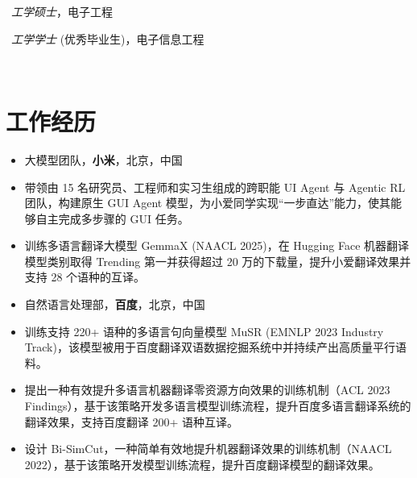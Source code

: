 \documentclass{resume}
\begin{document}
\ \textit{工学硕士}，电子工程

\ \textit{工学学士} (优秀毕业生)，电子信息工程

\



\section{工作经历}

\begin{itemize}
\item[] 大模型团队，\textbf{小米}，北京，中国
\item 带领由 15 名研究员、工程师和实习生组成的跨职能 UI Agent 与 Agentic RL 团队，构建原生 GUI Agent 模型，为小爱同学实现“一步直达”能力，使其能够自主完成多步骤的 GUI 任务。
\item 训练多语言翻译大模型 GemmaX (NAACL 2025)，在 Hugging Face 机器翻译模型类别取得 Trending 第一并获得超过 20 万的下载量，提升小爱翻译效果并支持 28 个语种的互译。
\end{itemize}

\begin{itemize}
\item[] 自然语言处理部，\textbf{百度}，北京，中国
\item 训练支持 220+ 语种的多语言句向量模型 MuSR (EMNLP 2023 Industry Track)，该模型被用于百度翻译双语数据挖掘系统中并持续产出高质量平行语料。
\item 提出一种有效提升多语言机器翻译零资源方向效果的训练机制（ACL 2023 Findings），基于该策略开发多语言模型训练流程，提升百度多语言翻译系统的翻译效果，支持百度翻译 200+ 语种互译。
\item 设计 Bi-SimCut，一种简单有效地提升机器翻译效果的训练机制（NAACL 2022），基于该策略开发模型训练流程，提升百度翻译模型的翻译效果。
\end{itemize}
\end{document}
